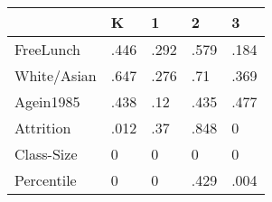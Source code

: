 \documentclass[a4paper,11pt]{article}
\begin{document}
\begin{table}[htbp]
\begin{tabular}{lllll} \hline \hline
 & K  & 1  & 2  & 3  \\  \hline 
FreeLunch & .446 & .292 & .579 & .184 \\  
White/Asian & .647 & .276 & .71 & .369 \\  
Agein1985 & .438 & .12 & .435 & .477 \\  
Attrition & .012 & .37 & .848 & 0 \\  
Class-Size & 0 & 0 & 0 & 0 \\  
Percentile & 0 & 0 & .429 & .004 \\  
\hline \hline \end{tabular}
\end{table}
\end{document}
